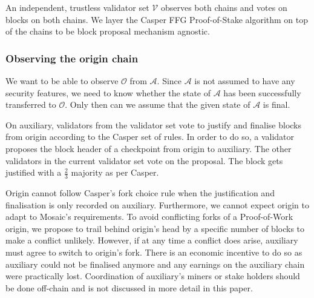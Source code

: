 \documentclass[12pt,a4paper,draft]{article}
\newcommand{\A}{\mathcal{A}}
\newcommand{\OC}{\mathcal{O}}
\newcommand{\V}{\mathcal{V}}
\newcommand{\SR}{\operatorname{SR}}
\newcommand{\SO}{\operatorname{SO}}
\newcommand{\OL}{\operatorname{OL}}
\begin{document}
An independent, trustless validator set $\V$ observes both chains and votes on blocks on both chains.
We layer the Casper FFG Proof-of-Stake \cite{casperffg} algorithm on top of the chains to be block proposal mechanism agnostic.

%

%
%
%
%

\subsubsection{Observing the origin chain}

We want to be able to observe $\OC$ from $\A$.
Since $\A$ is not assumed to have any security features,
we need to know whether the state of $\A$ has been successfully transferred to $\OC$.
Only then can we assume that the given state of $\A$ is final.

On auxiliary,
validators from the validator set vote to justify and finalise blocks from origin according to the Casper set of rules.
In order to do so, a validator proposes the block header of a checkpoint from origin to auxiliary.
The other validators in the current validator set vote on the proposal.
The block gets justified with a $\frac{2}{3}$ majority as per Casper.

Origin cannot follow Casper's fork choice rule when the justification and finalisation is only recorded on auxiliary.
Furthermore, we cannot expect origin to adapt to Mosaic's requirements.
To avoid conflicting forks of a Proof-of-Work origin,
we propose to trail behind origin's head by a specific number of blocks to make a conflict unlikely.
However, if at any time a conflict does arise, auxiliary must agree to switch to origin's fork.
There is an economic incentive to do so as auxiliary could not be finalised anymore and any earnings on the auxiliary chain were practically lost.
Coordination of auxiliary's miners or stake holders should be done off-chain and is not discussed in more detail in this paper.
\end{document}
